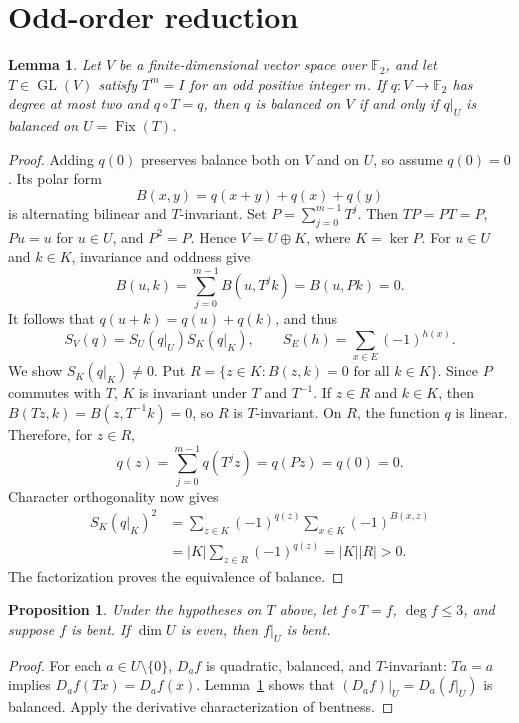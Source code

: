 \documentclass[11pt,a4paper]{article}
\newtheorem{lemma}[theorem]{Lemma}
\newtheorem{proposition}[theorem]{Proposition}
\newcommand{\F}{\mathbb F_2}
\newcommand{\Fix}{\operatorname{Fix}}
\begin{document}
\section{Odd-order reduction}
\begin{lemma}\label{lem:reduction}
Let $V$ be a finite-dimensional vector space over $\F$, and let $T\in\operatorname{GL}(V)$ satisfy $T^m=I$ for an odd positive integer $m$. If $q:V\to\F$ has degree at most two and $q\circ T=q$, then $q$ is balanced on $V$ if and only if $q|_U$ is balanced on $U=\Fix(T)$.
\end{lemma}
\begin{proof}
Adding $q(0)$ preserves balance both on $V$ and on $U$, so assume $q(0)=0$. Its polar form
\[B(x,y)=q(x+y)+q(x)+q(y)\]
is alternating bilinear and $T$-invariant. Set $P=\sum_{j=0}^{m-1}T^j$. Then $TP=PT=P$, $Pu=u$ for $u\in U$, and $P^2=P$. Hence $V=U\oplus K$, where $K=\ker P$. For $u\in U$ and $k\in K$, invariance and oddness give
\[B(u,k)=\sum_{j=0}^{m-1}B(u,T^jk)=B(u,Pk)=0.\]
It follows that $q(u+k)=q(u)+q(k)$, and thus
\[S_V(q)=S_U(q|_U)S_K(q|_K),\qquad S_E(h)=\sum_{x\in E}(-1)^{h(x)}.\]
We show $S_K(q|_K)\ne0$. Put $R=\{z\in K:B(z,k)=0\text{ for all }k\in K\}$. Since $P$ commutes with $T$, $K$ is invariant under $T$ and $T^{-1}$. If $z\in R$ and $k\in K$, then $B(Tz,k)=B(z,T^{-1}k)=0$, so $R$ is $T$-invariant. On $R$, the function $q$ is linear. Therefore, for $z\in R$,
\[q(z)=\sum_{j=0}^{m-1}q(T^jz)=q(Pz)=q(0)=0.\]
Character orthogonality now gives
\begin{align*}
 S_K(q|_K)^2
 &=\sum_{z\in K}(-1)^{q(z)}\sum_{x\in K}(-1)^{B(x,z)}\\
 &=|K|\sum_{z\in R}(-1)^{q(z)}=|K||R|>0.
\end{align*}
The factorization proves the equivalence of balance.
\end{proof}

\begin{proposition}\label{prop:restriction}
Under the hypotheses on $T$ above, let $f\circ T=f$, $\deg f\le3$, and suppose $f$ is bent. If $\dim U$ is even, then $f|_U$ is bent.
\end{proposition}
\begin{proof}
For each $a\in U\setminus\{0\}$, $D_af$ is quadratic, balanced, and $T$-invariant: $Ta=a$ implies $D_af(Tx)=D_af(x)$. Lemma~\ref{lem:reduction} shows that $(D_af)|_U=D_a(f|_U)$ is balanced. Apply the derivative characterization of bentness.
\end{proof}
\end{document}
